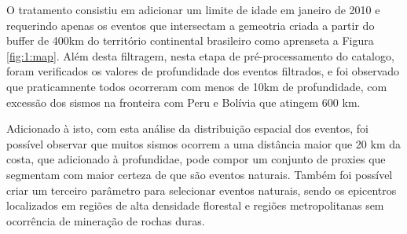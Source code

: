 \par{
    O tratamento consistiu em adicionar um limite de idade em janeiro de 2010 e requerindo apenas os eventos que intersectam a gemeotria criada a partir do buffer de 400km do território continental brasileiro como aprenseta a Figura \ref{fig:1:map}. Além desta filtragem, nesta etapa de pré-processamento do catalogo, foram verificados os valores de profundidade dos eventos filtrados, e foi observado que praticamnente todos ocorreram com menos de 10km de profundidade, com excessão dos sismos na fronteira com Peru e Bolívia que atingem 600 km.
}





\par{
    Adicionado à isto, com esta análise da distribuição espacial dos eventos, foi possível observar que muitos sismos ocorrem a uma distância maior que 20 km da costa, que adicionado à profundidae, pode compor um conjunto de proxies que segmentam com maior certeza de que são eventos naturais. Também foi possível criar um terceiro parâmetro para selecionar eventos naturais, sendo os epicentros localizados em regiões de alta densidade florestal e regiões metropolitanas sem ocorrência de mineração de rochas duras.
}




